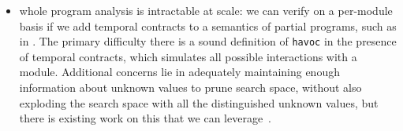 \begin{itemize}
{}
%
\item{whole program analysis is intractable at scale:
%
we can verify on a per-module basis if we add temporal contracts to a semantics of partial programs, such as in \citet{dvanhorn:TobinHochstadt2012Higherorder}.
%
The primary difficulty there is a sound definition of {\tt havoc} in the presence of temporal contracts, which simulates all possible interactions with a module.
%
Additional concerns lie in adequately maintaining enough information about unknown values to prune search space, without also exploding the search space with all the distinguished unknown values, but there is existing work on this that we can leverage~\citep{ianjohnson:DBLP:journals/cacm/DilligDA10}.
}
\end{itemize}
%
%
